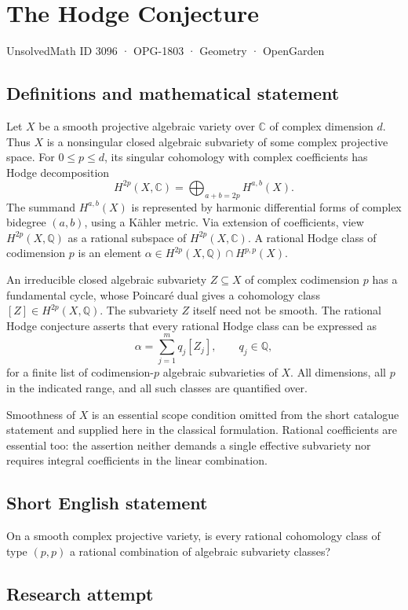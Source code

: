 \documentclass[11pt,a4paper]{article}
\begin{document}
\section*{The Hodge Conjecture}\label{3096}
{\small UnsolvedMath ID 3096 · OPG-1803 · Geometry · OpenGarden}
\subsection{Definitions and mathematical statement}
Let $X$ be a smooth projective algebraic variety over $\mathbb C$ of
complex dimension $d$. Thus $X$ is a nonsingular closed algebraic subvariety
of some complex projective space. For $0\le p\le d$, its singular
cohomology with complex coefficients has Hodge decomposition
\[
 H^{2p}(X,\mathbb C)=\bigoplus_{a+b=2p}H^{a,b}(X).
\]
The summand $H^{a,b}(X)$ is represented by harmonic differential forms
of complex bidegree $(a,b)$, using a Kähler metric.
Via extension of coefficients, view $H^{2p}(X,\mathbb Q)$ as a rational
subspace of $H^{2p}(X,\mathbb C)$. A rational Hodge class of codimension
$p$ is an element
$\alpha\in H^{2p}(X,\mathbb Q)\cap H^{p,p}(X)$.

An irreducible closed algebraic subvariety $Z\subseteq X$ of complex
codimension $p$ has a fundamental cycle, whose Poincaré dual gives a
cohomology class $[Z]\in H^{2p}(X,\mathbb Q)$. The subvariety $Z$ itself
need not be smooth.
The rational Hodge conjecture asserts that every rational Hodge class
can be expressed as
\[
 \alpha=\sum_{j=1}^m q_j[Z_j],\qquad q_j\in\mathbb Q,
\]
for a finite list of codimension-$p$ algebraic subvarieties of $X$.
All dimensions, all $p$ in the indicated range, and all such classes
are quantified over.

Smoothness of $X$ is an essential scope condition omitted from the short
catalogue statement and supplied here in the classical formulation.
Rational coefficients are essential too: the assertion neither demands
a single effective subvariety nor requires integral coefficients in the
linear combination.
\subsection{Short English statement}
On a smooth complex projective variety, is every rational cohomology class of type $(p,p)$ a rational combination of algebraic subvariety classes?
\subsection{Research attempt}
\end{document}
